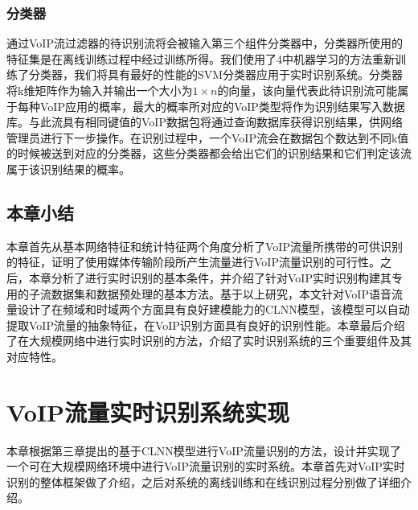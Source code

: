 \subsection{分类器}
通过VoIP流过滤器的待识别流将会被输入第三个组件分类器中，分类器所使用的特征集是在离线训练过程中经过训练所得。我们使用了4中机器学习的方法重新训练了分类器，我们将具有最好的性能的SVM分类器应用于实时识别系统。分类器将k维矩阵作为输入并输出一个大小为$1 \times n$的向量，该向量代表此待识别流可能属于每种VoIP应用的概率，最大的概率所对应的VoIP类型将作为识别结果写入数据库。与此流具有相同键值的VoIP数据包将通过查询数据库获得识别结果，供网络管理员进行下一步操作。在识别过程中，一个VoIP流会在数据包个数达到不同k值的时候被送到对应的分类器，这些分类器都会给出它们的识别结果和它们判定该流属于该识别结果的概率。

\section{本章小结}
本章首先从基本网络特征和统计特征两个角度分析了VoIP流量所携带的可供识别的特征，证明了使用媒体传输阶段所产生流量进行VoIP流量识别的可行性。之后，本章分析了进行实时识别的基本条件，并介绍了针对VoIP实时识别构建其专用的子流数据集和数据预处理的基本方法。基于以上研究，本文针对VoIP语音流量设计了在频域和时域两个方面具有良好建模能力的CLNN模型，该模型可以自动提取VoIP流量的抽象特征，在VoIP识别方面具有良好的识别性能。本章最后介绍了在大规模网络中进行实时识别的方法，介绍了实时识别系统的三个重要组件及其对应特性。















\chapter{VoIP流量实时识别系统实现}
本章根据第三章提出的基于CLNN模型进行VoIP流量识别的方法，设计并实现了一个可在大规模网络环境中进行VoIP流量识别的实时系统。本章首先对VoIP实时识别的整体框架做了介绍，之后对系统的离线训练和在线识别过程分别做了详细介绍。

